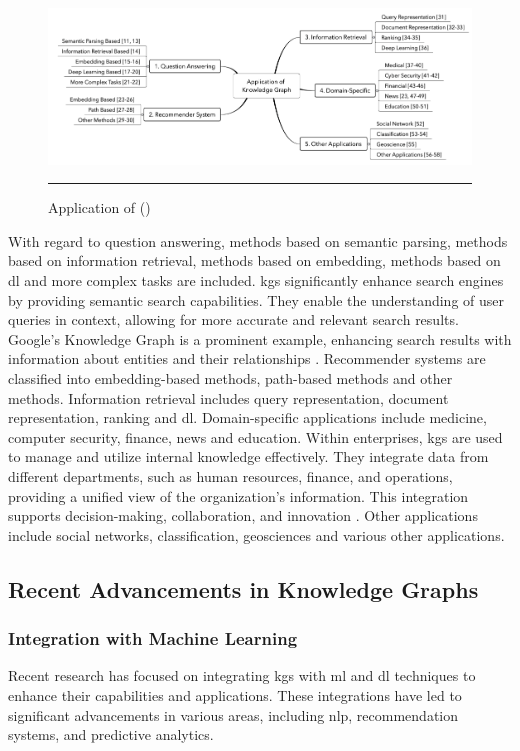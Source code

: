 \begin{figure}[htbp]
    \centering
 \includegraphics[width=.9\textwidth]{figures/literature-review/kg-application-fields.png}
     \rule{35em}{0.5pt}
    \caption{Application of  (\textcite{Zou2020})} 
 \label{fig:kg-application-fields}
\end{figure}

With regard to question answering, methods based on semantic parsing, methods based on information retrieval, methods based on embedding, methods based on \gls{dl} and more complex tasks are included.
\glspl{kg} significantly enhance search engines by providing semantic search capabilities. They enable the understanding of user queries in context, allowing for more accurate and relevant search results. Google's Knowledge Graph is a prominent example, enhancing search results with information about entities and their relationships \cite{singhal2012introducing}.
Recommender systems are classified into embedding-based methods, path-based methods and other methods. Information retrieval includes query representation, document representation, ranking and \gls{dl}. Domain-specific applications include medicine, computer security, finance, news and education.
Within enterprises, \glspl{kg} are used to manage and utilize internal knowledge effectively. They integrate data from different departments, such as human resources, finance, and operations, providing a unified view of the organization's information. This integration supports decision-making, collaboration, and innovation \cite{pujara2013knowledge}.
Other applications include social networks, classification, geosciences and various other applications.


\subsection*{Recent Advancements in Knowledge Graphs}

\subsubsection*{Integration with Machine Learning}
Recent research has focused on integrating \glspl{kg} with \gls{ml} and \gls{dl} techniques to enhance their capabilities and applications. These integrations have led to significant advancements in various areas, including \gls{nlp}, recommendation systems, and predictive analytics.

